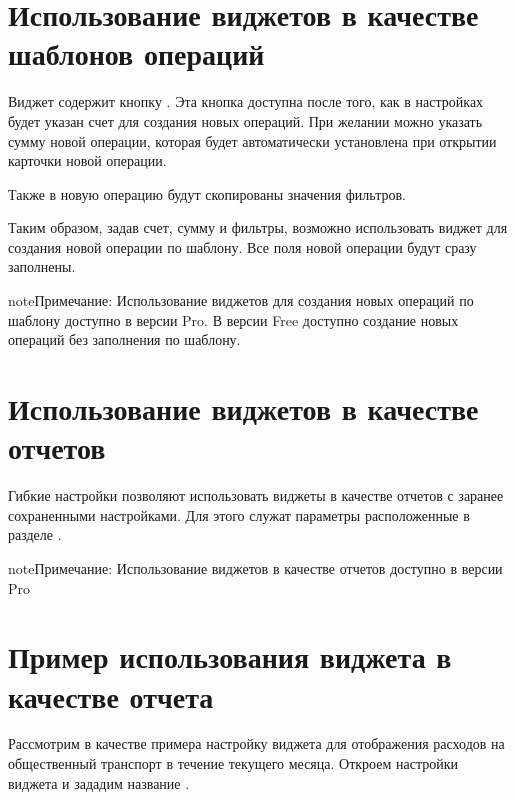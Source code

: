 \documentclass[a4paper,10pt,russian]{sphinxmanual}
\begin{document}
\noindent{}

\noindent{}


\section{Использование виджетов в качестве шаблонов операций}
\label{\detokenize{widgets:id3}}
\sphinxAtStartPar
Виджет содержит кнопку . Эта кнопка доступна после того, как в настройках будет указан счет для
создания новых операций. При желании можно указать сумму новой операции, которая будет автоматически установлена
при открытии карточки новой операции.

\sphinxAtStartPar
Также в новую операцию будут скопированы значения фильтров.

\sphinxAtStartPar
Таким образом, задав счет, сумму и фильтры, возможно использовать виджет для создания новой операции по шаблону. Все
поля новой операции будут сразу заполнены.

\begin{sphinxadmonition}{note}{Примечание:}
\sphinxAtStartPar
Использование виджетов для создания новых операций по шаблону доступно в версии Pro. В версии Free доступно создание новых операций без заполнения по шаблону.
\end{sphinxadmonition}


\section{Использование виджетов в качестве отчетов}
\label{\detokenize{widgets:id4}}
\sphinxAtStartPar
Гибкие настройки позволяют использовать виджеты в качестве отчетов с заранее сохраненными настройками. Для этого
служат параметры расположенные в разделе .

\begin{sphinxadmonition}{note}{Примечание:}
\sphinxAtStartPar
Использование виджетов в качестве отчетов доступно в версии Pro
\end{sphinxadmonition}


\section{Пример использования виджета в качестве отчета}
\label{\detokenize{widgets:id5}}
\sphinxAtStartPar
Рассмотрим в качестве примера настройку виджета для отображения расходов на общественный транспорт в течение текущего месяца.
Откроем настройки виджета и зададим название .
\end{document}
